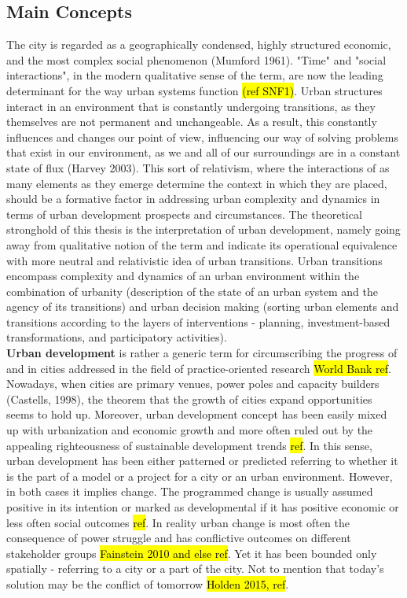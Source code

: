 \documentclass[11pt]{report}
\begin{document}
\subsection{Main Concepts}
The city is regarded as a geographically condensed, highly structured economic, and the most complex social phenomenon (Mumford 1961). "Time" and "social interactions", in the modern qualitative sense of the term, are now the leading determinant for the way urban systems function \hl{(ref SNF1)}. Urban structures interact in an environment that is constantly undergoing transitions, as they themselves are not permanent and unchangeable. As a result, this constantly influences and changes our point of view, influencing our way of solving problems that exist in our environment, as we and all of our surroundings are in a constant state of flux (Harvey 2003). This sort of relativism, where the interactions of as many elements as they emerge determine the context in which they are placed, should be a formative factor in addressing urban complexity and dynamics in terms of urban development prospects and circumstances. The theoretical stronghold of this thesis is the interpretation of urban development, namely going away from qualitative notion of the term and indicate its operational equivalence with more neutral and relativistic idea of urban transitions. Urban transitions encompass complexity and dynamics of an urban environment within the combination of urbanity (description of the state of an urban system and the agency of its transitions) and urban decision making (sorting urban elements and transitions according to the layers of interventions - planning, investment-based transformations, and participatory activities).
\\ 
\textbf{Urban development} is rather a generic term for circumscribing the progress of and in cities addressed in the  field of practice-oriented research \hl{World Bank ref}. Nowadays, when cities are primary venues, power poles and capacity builders (Castells, 1998), the theorem that the growth of cities expand opportunities seems to hold up. Moreover, urban development concept has been easily mixed up with urbanization and economic growth and more often ruled out by the appealing righteousness of sustainable development trends \hl{ref}.  In this sense, urban development has been either patterned or predicted referring to whether it is the part of a model or a project for a city or an urban environment. However, in both cases it implies change. The programmed change is usually assumed positive in its intention or marked as developmental if it has positive economic or less often social outcomes \hl{ref}. In reality urban change is most often the consequence of power struggle and has conflictive outcomes on different stakeholder groups \hl{Fainstein 2010 and else ref}. Yet it has been bounded only spatially - referring to a city or a part of the city. Not to mention that today's solution may be the conflict of tomorrow \hl{Holden 2015, ref}.
\end{document}
